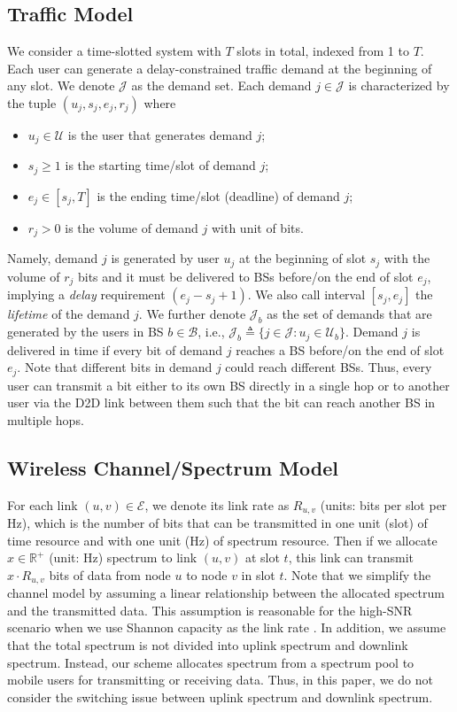 \subsection{Traffic Model} \label{sec:traffic_model}
We consider a time-slotted system with $T$ slots in total, indexed from 1 to $T$.
Each user can generate a delay-constrained traffic demand at the beginning of any slot.
We denote $\mathcal{J}$ as the demand set. Each demand $j \in \mathcal{J}$ is characterized by the tuple $(u_j, s_j, e_j, r_j)$
where
\begin{itemize}
\item $u_j \in \mathcal{U}$ is the user that generates demand $j$;
\item $s_j \ge 1$ is the starting time/slot of demand $j$;
\item $e_j \in [s_j, T]$ is the ending time/slot (deadline) of demand $j$;
\item $r_j > 0$ is the volume of demand $j$ with unit of bits.
\end{itemize}
Namely, demand $j$ is generated by user $u_j$ at the beginning of slot $s_j$
with the volume of $r_j$ bits and it must be delivered to BSs before/on the end of slot $e_j$,
implying a \emph{delay} requirement $(e_j - s_j +1)$.
We also call interval $[s_j, e_j]$ the \emph{lifetime} of the demand $j$.
We further denote $\mathcal{J}_b$
as the set of demands that are generated by the users in BS $b \in \mathcal{B}$, i.e.,
$
\mathcal{J}_b \triangleq \{j \in \mathcal{J}: u_j \in \mathcal{U}_b\}.
$
Demand $j$ is delivered in time if every bit of demand $j$ reaches a BS
before/on the end of slot $e_j$. Note that different bits in demand $j$ could reach different BSs.
Thus, every user can transmit a bit either to its own BS directly in a single hop or to another user
via the D2D link between them such that the bit can reach another BS in multiple hops.



\subsection{Wireless Channel/Spectrum Model}
For each link $(u,v)\in\mathcal{E}$, we
denote its link rate as $R_{u,v}$ (units: bits per slot per Hz), which
is the number of bits that can be transmitted in one unit (slot) of time resource and with
one unit (Hz) of spectrum resource. Then if we allocate $x \in \mathbb{R}^+$ (unit: Hz) spectrum to link $(u,v)$ at slot $t$,
this link can transmit $x\cdot R_{u,v}$ bits of data from node $u$ to node $v$ in slot $t$.
Note that we simplify the channel model by assuming a linear relationship between the allocated spectrum
and the transmitted data. This assumption is reasonable for the high-SNR scenario when we use
Shannon capacity as the link rate \cite{shannon}.
In addition, we assume that the total spectrum is not divided into uplink spectrum and downlink
spectrum. Instead, our scheme allocates spectrum from a spectrum pool to mobile users for transmitting or
receiving data. Thus, in this paper, we do not consider the switching issue between uplink spectrum and downlink spectrum.





